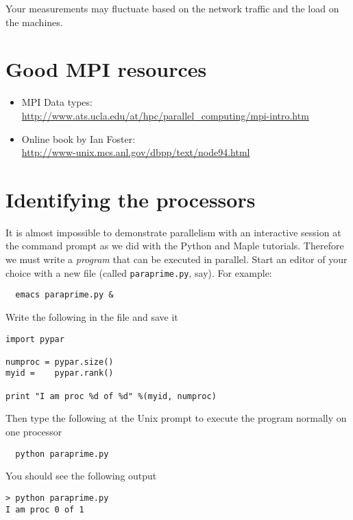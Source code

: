 \documentclass[12pt]{article}
\begin{document}
Your measurements may fluctuate based on the network traffic and the 
load on the machines. 


\section*{Good MPI resources}
\begin{itemize} 
  \item MPI Data types:\\ 
    \url{http://www.ats.ucla.edu/at/hpc/parallel_computing/mpi-intro.htm}
  \item Online book by Ian Foster:\\ 
    \url{http://www-unix.mcs.anl.gov/dbpp/text/node94.html}
\end{itemize}        





\section{Identifying the processors}

 


It is almost impossible to demonstrate parallelism with an interactive
session at the command prompt as we did with the Python and Maple tutorials.
Therefore we must write a \emph{program} that can be executed in parallel.
Start an editor of your choice with a new file
(called \texttt{paraprime.py}, say). For example:
\begin{verbatim}
  emacs paraprime.py &
\end{verbatim}

\noindent Write the following in the file and save it
{\small \begin{verbatim}
import pypar

numproc = pypar.size()
myid =    pypar.rank()

print "I am proc %d of %d" %(myid, numproc)
\end{verbatim}}

Then type the following at the Unix prompt to execute the
program normally on one processor
{\small \begin{verbatim}
  python paraprime.py
\end{verbatim}}
\noindent You should see the following output
{\small \begin{verbatim}
> python paraprime.py
I am proc 0 of 1
\end{verbatim}}
\end{document}
